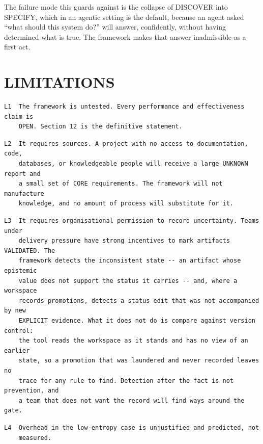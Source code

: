 \documentclass[11pt,a4paper]{article}
\begin{document}
The failure mode this guards against is the collapse of DISCOVER into SPECIFY, which in an agentic setting is the default, because an agent asked ``what should this system do?'' will answer, confidently, without having determined what is true. The framework makes that answer inadmissible as a first act.

\section{LIMITATIONS}

\begin{Verbatim}[fontsize=\footnotesize,breaklines=true,breakanywhere=true,breakautoindent=false,samepage=false]
L1  The framework is untested. Every performance and effectiveness claim is
    OPEN. Section 12 is the definitive statement.
\end{Verbatim}

\begin{Verbatim}[fontsize=\footnotesize,breaklines=true,breakanywhere=true,breakautoindent=false,samepage=false]
L2  It requires sources. A project with no access to documentation, code,
    databases, or knowledgeable people will receive a large UNKNOWN report and
    a small set of CORE requirements. The framework will not manufacture
    knowledge, and no amount of process will substitute for it.
\end{Verbatim}

\begin{Verbatim}[fontsize=\footnotesize,breaklines=true,breakanywhere=true,breakautoindent=false,samepage=false]
L3  It requires organisational permission to record uncertainty. Teams under
    delivery pressure have strong incentives to mark artifacts VALIDATED. The
    framework detects the inconsistent state -- an artifact whose epistemic
    value does not support the status it carries -- and, where a workspace
    records promotions, detects a status edit that was not accompanied by new
    EXPLICIT evidence. What it does not do is compare against version control:
    the tool reads the workspace as it stands and has no view of an earlier
    state, so a promotion that was laundered and never recorded leaves no
    trace for any rule to find. Detection after the fact is not prevention, and
    a team that does not want the record will find ways around the gate.
\end{Verbatim}

\begin{Verbatim}[fontsize=\footnotesize,breaklines=true,breakanywhere=true,breakautoindent=false,samepage=false]
L4  Overhead in the low-entropy case is unjustified and predicted, not
    measured.
\end{Verbatim}
\end{document}
